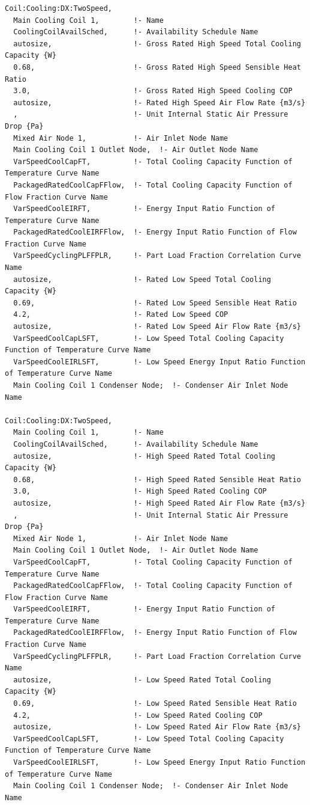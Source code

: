 \begin{lstlisting}
Coil:Cooling:DX:TwoSpeed,
  Main Cooling Coil 1,        !- Name
  CoolingCoilAvailSched,      !- Availability Schedule Name
  autosize,                   !- Gross Rated High Speed Total Cooling Capacity {W}
  0.68,                       !- Gross Rated High Speed Sensible Heat Ratio
  3.0,                        !- Gross Rated High Speed Cooling COP
  autosize,                   !- Rated High Speed Air Flow Rate {m3/s}
  ,                           !- Unit Internal Static Air Pressure Drop {Pa}
  Mixed Air Node 1,           !- Air Inlet Node Name
  Main Cooling Coil 1 Outlet Node,  !- Air Outlet Node Name
  VarSpeedCoolCapFT,          !- Total Cooling Capacity Function of Temperature Curve Name
  PackagedRatedCoolCapFFlow,  !- Total Cooling Capacity Function of Flow Fraction Curve Name
  VarSpeedCoolEIRFT,          !- Energy Input Ratio Function of Temperature Curve Name
  PackagedRatedCoolEIRFFlow,  !- Energy Input Ratio Function of Flow Fraction Curve Name
  VarSpeedCyclingPLFFPLR,     !- Part Load Fraction Correlation Curve Name
  autosize,                   !- Rated Low Speed Total Cooling Capacity {W}
  0.69,                       !- Rated Low Speed Sensible Heat Ratio
  4.2,                        !- Rated Low Speed COP
  autosize,                   !- Rated Low Speed Air Flow Rate {m3/s}
  VarSpeedCoolCapLSFT,        !- Low Speed Total Cooling Capacity Function of Temperature Curve Name
  VarSpeedCoolEIRLSFT,        !- Low Speed Energy Input Ratio Function of Temperature Curve Name
  Main Cooling Coil 1 Condenser Node;  !- Condenser Air Inlet Node Name

Coil:Cooling:DX:TwoSpeed,
  Main Cooling Coil 1,        !- Name
  CoolingCoilAvailSched,      !- Availability Schedule Name
  autosize,                   !- High Speed Rated Total Cooling Capacity {W}
  0.68,                       !- High Speed Rated Sensible Heat Ratio
  3.0,                        !- High Speed Rated Cooling COP
  autosize,                   !- High Speed Rated Air Flow Rate {m3/s}
  ,                           !- Unit Internal Static Air Pressure Drop {Pa}
  Mixed Air Node 1,           !- Air Inlet Node Name
  Main Cooling Coil 1 Outlet Node,  !- Air Outlet Node Name
  VarSpeedCoolCapFT,          !- Total Cooling Capacity Function of Temperature Curve Name
  PackagedRatedCoolCapFFlow,  !- Total Cooling Capacity Function of Flow Fraction Curve Name
  VarSpeedCoolEIRFT,          !- Energy Input Ratio Function of Temperature Curve Name
  PackagedRatedCoolEIRFFlow,  !- Energy Input Ratio Function of Flow Fraction Curve Name
  VarSpeedCyclingPLFFPLR,     !- Part Load Fraction Correlation Curve Name
  autosize,                   !- Low Speed Rated Total Cooling Capacity {W}
  0.69,                       !- Low Speed Rated Sensible Heat Ratio
  4.2,                        !- Low Speed Rated Cooling COP
  autosize,                   !- Low Speed Rated Air Flow Rate {m3/s}
  VarSpeedCoolCapLSFT,        !- Low Speed Total Cooling Capacity Function of Temperature Curve Name
  VarSpeedCoolEIRLSFT,        !- Low Speed Energy Input Ratio Function of Temperature Curve Name
  Main Cooling Coil 1 Condenser Node;  !- Condenser Air Inlet Node Name


\end{lstlisting}

